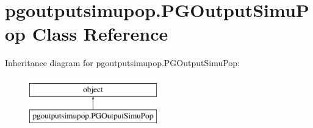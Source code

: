 \hypertarget{classpgoutputsimupop_1_1PGOutputSimuPop}{}\section{pgoutputsimupop.\+P\+G\+Output\+Simu\+Pop Class Reference}
\label{classpgoutputsimupop_1_1PGOutputSimuPop}
Inheritance diagram for pgoutputsimupop.\+P\+G\+Output\+Simu\+Pop\+:\begin{figure}[H]
\begin{center}
\leavevmode
\includegraphics[height=2.000000cm]{classpgoutputsimupop_1_1PGOutputSimuPop}
\end{center}
\end{figure}
